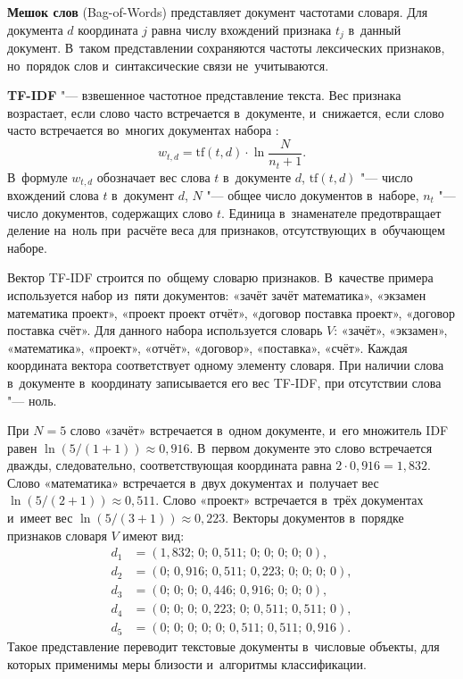 \textbf{Мешок слов} (Bag-of-Words) представляет документ частотами словаря.
Для документа \( d \) координата \( j \) равна числу вхождений признака
\( t_j \) в~данный документ. В~таком представлении сохраняются частоты
лексических признаков, но~порядок слов и~синтаксические связи не~учитываются.

\textbf{TF-IDF} "--- взвешенное частотное представление текста. Вес признака
возрастает, если слово часто встречается в~документе, и~снижается, если слово
часто встречается во~многих документах набора
\autocite{Salton1988TFIDF,Manning2008IR}:
\begin{equation}
    \label{eq:tfidf}
    w_{t,d} = \mathrm{tf}(t,d)\cdot \ln\frac{N}{n_t + 1}.
\end{equation}
В~формуле \( w_{t,d} \) обозначает вес слова \( t \) в~документе \( d \),
\( \mathrm{tf}(t,d) \) "--- число вхождений слова \( t \) в~документ \( d \),
\( N \) "--- общее число документов в~наборе, \( n_t \) "--- число документов,
содержащих слово \( t \). Единица в~знаменателе предотвращает деление на~ноль
при~расчёте веса для признаков, отсутствующих в~обучающем наборе.

Вектор TF-IDF строится по~общему словарю признаков. В~качестве
примера используется набор из~пяти документов: «зачёт зачёт математика»,
«экзамен математика проект», «проект проект отчёт», «договор поставка проект»,
«договор поставка счёт».
Для данного набора используется словарь \( V \): «зачёт», «экзамен»,
«математика», «проект», «отчёт», «договор», «поставка», «счёт». Каждая
координата вектора соответствует одному элементу словаря. При наличии слова
в~документе в~координату записывается его вес TF-IDF, при отсутствии слова "---
ноль.

При \( N = 5 \) слово «зачёт» встречается в~одном документе, и~его множитель
IDF равен \( \ln(5/(1+1)) \approx 0{,}916 \). В~первом документе это слово
встречается дважды, следовательно, соответствующая координата равна
\( 2 \cdot 0{,}916 = 1{,}832 \). Слово «математика» встречается в~двух
документах и~получает вес \( \ln(5/(2+1)) \approx 0{,}511 \). Слово «проект»
встречается в~трёх документах и~имеет вес
\( \ln(5/(3+1)) \approx 0{,}223 \). Векторы документов в~порядке признаков
словаря \( V \) имеют вид:
\[
    \begin{aligned}
        d_1 &= (1{,}832;\,0;\,0{,}511;\,0;\,0;\,0;\,0;\,0),\\
        d_2 &= (0;\,0{,}916;\,0{,}511;\,0{,}223;\,0;\,0;\,0;\,0),\\
        d_3 &= (0;\,0;\,0;\,0{,}446;\,0{,}916;\,0;\,0;\,0),\\
        d_4 &= (0;\,0;\,0;\,0{,}223;\,0;\,0{,}511;\,0{,}511;\,0),\\
        d_5 &= (0;\,0;\,0;\,0;\,0;\,0{,}511;\,0{,}511;\,0{,}916).
    \end{aligned}
\]
Такое представление переводит текстовые документы в~числовые объекты, для
которых применимы меры близости и~алгоритмы классификации.

